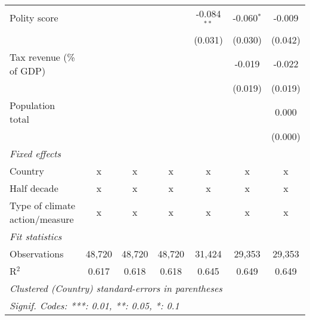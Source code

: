\begin{tabular}{lcccccc}
   Polity score                                                 &         &                &                & -0.084$^{**}$  & -0.060$^{*}$   & -0.009\\   
                                                                &         &                &                & (0.031)        & (0.030)        & (0.042)\\   
   Tax revenue (\% of GDP)                                      &         &                &                &                & -0.019         & -0.022\\   
                                                                &         &                &                &                & (0.019)        & (0.019)\\   
   Population total                                             &         &                &                &                &                & 0.000\\   
                                                                &         &                &                &                &                & (0.000)\\   
   \emph{Fixed effects}\\
   Country                                                      & x       & x              & x              & x              & x              & x\\  
   Half decade                                                  & x       & x              & x              & x              & x              & x\\  
   Type of climate action/measure                               & x       & x              & x              & x              & x              & x\\  
   \midrule \emph{Fit statistics}\\
   Observations                                                 & 48,720  & 48,720         & 48,720         & 31,424         & 29,353         & 29,353\\  
   R$^2$                                                        & 0.617   & 0.618          & 0.618          & 0.645          & 0.649          & 0.649\\  
   \midrule
   \multicolumn{7}{l}{\emph{Clustered (Country) standard-errors in parentheses}}\\
   \multicolumn{7}{l}{\emph{Signif. Codes: ***: 0.01, **: 0.05, *: 0.1}}\\
\end{tabular}
\par\endgroup



